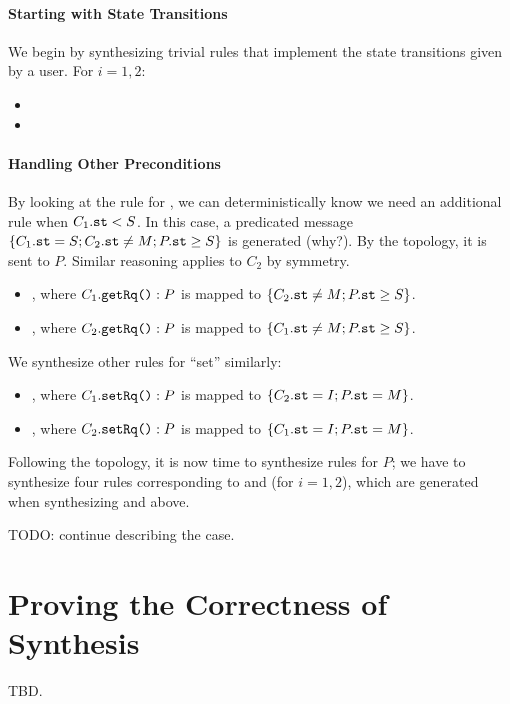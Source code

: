 \documentclass[format=manuscript]{acmart}
\begin{document}
\paragraph{Starting with State Transitions}

We begin by synthesizing trivial rules that implement the state transitions
given by a user. For $i = 1, 2$:

\begin{itemize}
\item {}
\item {}
\end{itemize}

\paragraph{Handling Other Preconditions}

By looking at the rule for , we can deterministically know we need
an additional rule when $C_1.\texttt{st} < S$. In this case, a predicated message $\{
C_1.\texttt{st} = S; C_2.\texttt{st} \neq M; P.\texttt{st} \geq S \}$ is generated (why?). By
the topology, it is sent to $P$. Similar reasoning applies to $C_2$ by symmetry.

\begin{itemize}
\item {}, where
  $C_1.\texttt{getRq()}:P$ is mapped to $\{ C_2.\texttt{st} \neq M; P.\texttt{st} \geq S \}$.
\item {}, where
  $C_2.\texttt{getRq()}:P$ is mapped to $\{ C_1.\texttt{st} \neq M; P.\texttt{st} \geq S \}$.
\end{itemize}

We synthesize other rules for ``set'' similarly:

\begin{itemize}
\item {},
  where $C_1.\texttt{setRq()}:P$ is mapped to $\{ C_2.\texttt{st} = I; P.\texttt{st} = M \}$.
\item {},
  where $C_2.\texttt{setRq()}:P$ is mapped to $\{ C_1.\texttt{st} = I; P.\texttt{st} = M \}$.
\end{itemize}

Following the topology, it is now time to synthesize rules for $P$; we have to
synthesize four rules corresponding to  and 
(for $i = 1, 2$), which are generated when synthesizing  and
 above.

TODO: continue describing the case.

\section{Proving the Correctness of Synthesis}

TBD.
\end{document}
